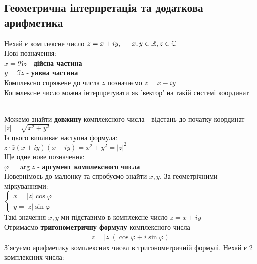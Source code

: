 \documentclass[a4paper, 14pt]{extarticle}
\def\bigline{\vspace{5mm}\\}
\theoremstyle{theoremdd}
\theoremstyle{theoremdd}
\theoremstyle{theoremdd}
\theoremstyle{theoremdd}
\theoremstyle{theoremdd}
\theoremstyle{theoremdd}
\theoremstyle{theoremdd}
\theoremstyle{theoremdd}
\begin{document}
\subsection{Геометрична інтерпретація та додаткова арифметика}
Нехай є комплексне число $z = x + iy, \hspace{0.5cm} x,y \in \mathbb{R}, z \in \mathbb{C}$\\
Нові позначення:\\
$x = \Re z$ - \textbf{дійсна частина} \\
$y = \Im z$ - \textbf{уявна частина}\\
Комплексно спряжене до числа $z$ позначаємо $\bar{z} = x - iy$
\bigline
Копмлексне число можна інтерпретувати як 'вектор' на такій системі координат\\
\\
Можемо знайти \textbf{довжину} комплексного числа - відстань до початку координат\\
$|z| = \sqrt{x^2+y^2}$\\
Із цього випливає наступна формула:\\
$z \cdot \bar{z} (x+iy)(x-iy) = x^2+y^2 = |z|^2$
\bigline
Ще одне нове позначення:\\
$\varphi = \arg z$ - \textbf{аргумент комплексного числа}
\bigline
Повернімось до малюнку та спробуємо знайти $x,y$. За геометрічними міркуваннями:\\
$\begin{cases}
x = |z| \cos \varphi \\
y = |z| \sin \varphi
\end{cases}
$\\
Такі значення $x,y$ ми підставимо в комплексне число $z = x + iy$\\
Отримаємо \textbf{тригонометричну формулу} комплексного числа
\begin{align*}
z = |z|(\cos \varphi + i \sin \varphi)
\end{align*}
З'ясуємо арифметику комплексних чисел в тригонометричній формулі. Нехай є 2 комплексних числа:\\
\end{document}
